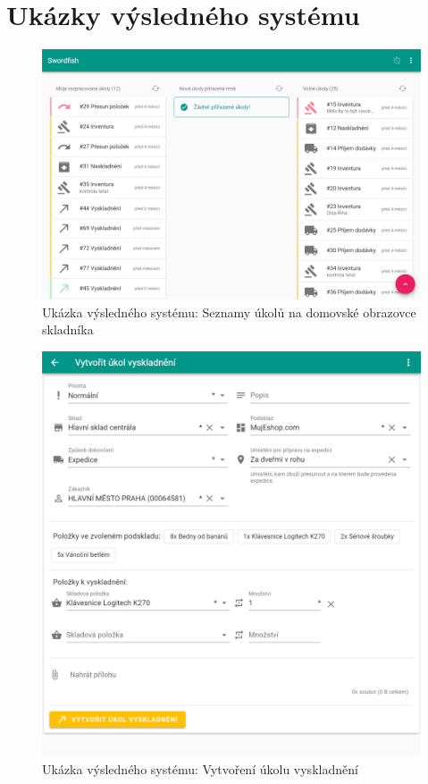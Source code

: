 \chapter{Ukázky výsledného systému} \label{ap:demo}

\begin{figure}[]
\includegraphics[width=\textwidth]{../png/app/demo1.png}
\caption{Ukázka výsledného systému: Seznamy úkolů na domovské obrazovce skladníka} \label{picture:demo1}
\end{figure}

\begin{figure}[]
\includegraphics[width=\textwidth]{../png/app/demo2.png}
\caption{Ukázka výsledného systému: Vytvoření úkolu vyskladnění} \label{picture:demo2}
\end{figure}

